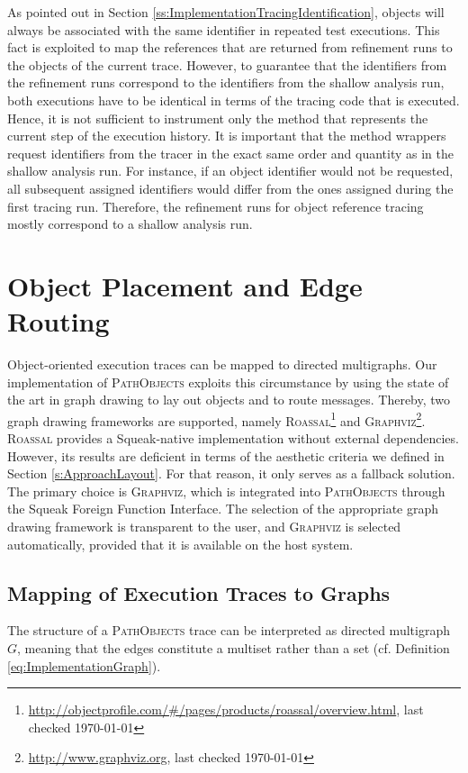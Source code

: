 As pointed out in Section \ref{ss:ImplementationTracingIdentification}, objects will always be associated with the same identifier in repeated test executions.
This fact is exploited to map the references that are returned from refinement runs to the objects of the current trace.
However, to guarantee that the identifiers from the refinement runs correspond to the identifiers from the shallow analysis run, both executions have to be identical in terms of the tracing code that is executed.
Hence, it is not sufficient to instrument only the method that represents the current step of the execution history.
It is important that the method wrappers request identifiers from the tracer in the exact same order and quantity as in the shallow analysis run.
For instance, if an object identifier would not be requested, all subsequent assigned identifiers would differ from the ones assigned during the first tracing run.
Therefore, the refinement runs for object reference tracing mostly correspond to a shallow analysis run.

\section[Object Placement and Edge Routing]{Object Placement and Edge Routing%
}
\label{s:ImplementationLayouting}
Object-oriented execution traces can be mapped to directed multigraphs.
Our implementation of \textsc{PathObjects} exploits this circumstance by using the state of the art in graph drawing to lay out objects and to route messages.
Thereby, two graph drawing frameworks are supported, namely \textsc{Roassal}\footnote{\url{http://objectprofile.com/\#/pages/products/roassal/overview.html}, last checked \today} and \textsc{Graphviz}\footnote{\url{http://www.graphviz.org}, last checked \today}.
\textsc{Roassal} provides a Squeak-native implementation without external dependencies.
However, its results are deficient in terms of the aesthetic criteria we defined in Section \ref{s:ApproachLayout}.
For that reason, it only serves as a fallback solution.
The primary choice is \textsc{Graphviz}, which is integrated into \textsc{PathObjects} through the Squeak Foreign Function Interface.
The selection of the appropriate graph drawing framework is transparent to the user, and  \textsc{Graphviz} is selected automatically, provided that it is available on the host system.

\subsection{Mapping of Execution Traces to Graphs}
The structure of a \textsc{PathObjects} trace can be interpreted as directed multigraph $G$, meaning that the edges constitute a multiset rather than a set (cf. Definition \ref{eq:ImplementationGraph}).

